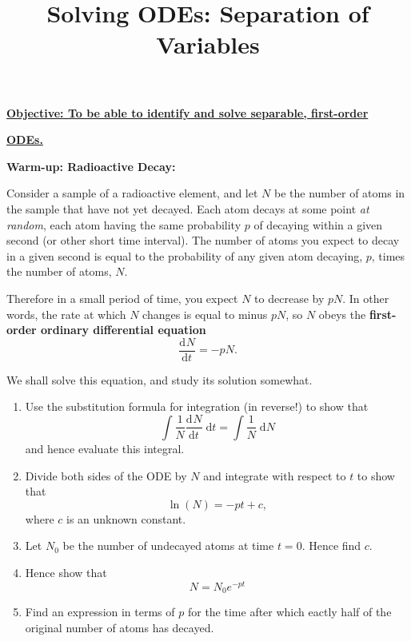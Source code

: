 \documentclass{article}
\newcommand{\deriv}[3][]{\frac{\mathrm{d}^{#1}#2}{\mathrm{d}#3^{#1}}}
\newcommand{\diff}{\;\mathrm{d}}
\begin{document}
\title{Solving ODEs: Separation of Variables}
\date{}

\maketitle
\thispagestyle{empty}

\Large

\textbf{\underline{Objective: To be able to identify and solve separable, first-order}}

\textbf{\underline{ODEs.}}







\vspace{5mm}







\textbf{Warm-up: Radioactive Decay:}\bigskip


Consider a sample of a radioactive element, and let $N$ be the number of atoms in the sample that have not yet decayed. Each atom decays at some point \textit{at random}, each atom having the same probability $p$ of decaying within a given second (or other short time interval). The number of atoms you expect to decay in a given second is equal to the probability of any given atom decaying, $p$, times the number of atoms, $N$.

Therefore in a small period of time, you expect $N$ to decrease by $pN$. In other words, the rate at which $N$ changes is equal to minus $pN$, so $N$ obeys the \textbf{first-order ordinary differential equation}
\[\deriv{N}{t}=-p N.\]

We shall solve this equation, and study its solution somewhat.

\begin{enumerate}
	\item Use the substitution formula for integration (in reverse!) to show that
		\[\int \frac{1}{N}\deriv{N}{t}\diff t=\int\frac{1}{N}\diff N\]
		and hence evaluate this integral.
	\item Divide both sides of the ODE by $N$ and integrate with respect to $t$ to show that
		\[\ln(N)=-pt+c,\]
		where $c$ is an unknown constant.
	\item Let $N_0$ be the number of undecayed atoms at time $t=0$. Hence find $c$.
	\item Hence show that
		\[N=N_0 e^{-pt}\]
	\item Find an expression in terms of $p$ for the time after which eactly half of the original number of atoms has decayed.
\end{enumerate}
\end{document}
